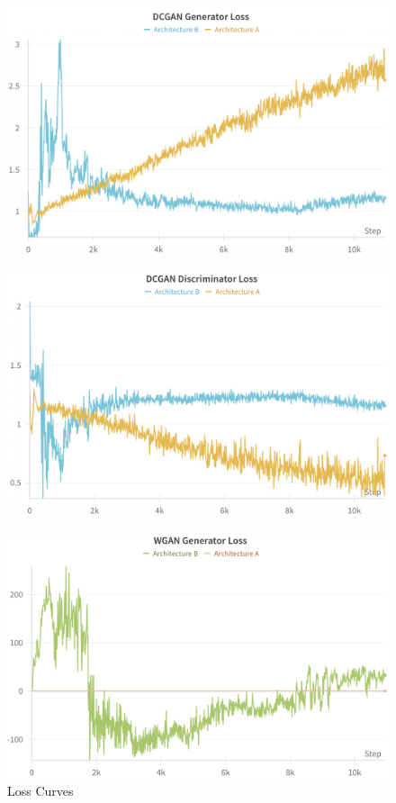 \documentclass{article}
\begin{document}
\begin{figure}[ht]
    \centering
    \caption{Loss Curves}
    \begin{minipage}[b]{0.45\textwidth}
        \centering
        \includegraphics[width=\textwidth]{../src/dc_gen_loss.png}
        \label{fig:image1}
    \end{minipage}
    \hfill
    \begin{minipage}[b]{0.45\textwidth}
        \centering
        \includegraphics[width=\textwidth]{../src/dc_discrim_loss.png}
        \label{fig:image2}
    \end{minipage}
    \begin{minipage}[b]{0.45\textwidth}
        \centering
        \includegraphics[width=\textwidth]{../src/wgan_gen_loss.png}

\end{minipage}
\end{figure}
\end{document}
